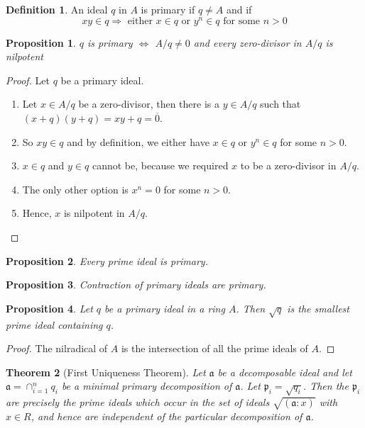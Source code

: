 \documentclass{book}
\theoremstyle{plain}
\newtheorem{thm}{Theorem}[chapter] %
\newtheorem{prps}{Proposition}
\theoremstyle{definition}
\theoremstyle{custom_definition}
\newtheorem{defn}[thm]{Definition}
\begin{document}
\begin{defn}
    An ideal \(q\) in \(A\) is primary if \(q \neq A\) and if
    \begin{equation}
        xy \in q \Rightarrow \text{ either } x \in q \text{ or } y^n \in q \text{ for some } n > 0
    \end{equation}
\end{defn}

\begin{prps}
    \(q\) is primary \(\iff\) \(A/q \neq 0\) and every zero-divisor in \(A/q\) is nilpotent
\end{prps}

\begin{proof}
    Let \(q\) be a primary ideal.
    \begin{enumerate}
        \item Let \(x \in A/q\) be a zero-divisor, then there is a \(y \in A/q\) such that \((x + q)(y + q) = xy + q = \overline{0}\).
        \item So \(xy \in q\) and by definition, we either have \(x \in q\) or \(y^n \in q\) for some \(n > 0\).
        \item \(x \in q\) and \(y \in q\) cannot be, because we required \(x\) to be a zero-divisor in \(A/q\).
        \item The only other option is \(x^n = 0\) for some \(n > 0\).
        \item Hence, \(x\) is nilpotent in \(A/q\).
    \end{enumerate}
\end{proof}

\begin{prps}
    Every prime ideal is primary.
\end{prps}

\begin{prps}
    Contraction of primary ideals are primary.
\end{prps}

\begin{prps}
    Let \(q\) be a primary ideal in a ring \(A\). Then \(\sqrt{q}\) is the smallest prime ideal containing \(q\).
\end{prps}

\begin{proof}
    The nilradical of \(A\) is the intersection of all the prime ideals of \(A\).
\end{proof}

\begin{thm}[First Uniqueness Theorem]
    Let \(\mathfrak{a}\) be a decomposable ideal and let \(\mathfrak{a} = \cap_{i = 1}^{n} q_i\) be a minimal primary decomposition of \(\mathfrak{a}\). Let \(\mathfrak{p}_i = \sqrt{q_i}\). Then the \(\mathfrak{p}_i\) are precisely the prime ideals which occur in the set of ideals \(\sqrt{(\mathfrak{a} : x)}\) with \(x \in R\), and hence are independent of the particular decomposition of \(\mathfrak{a}\).
\end{thm}
\end{document}
